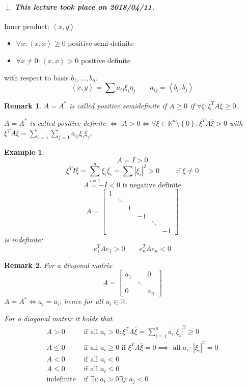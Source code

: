 \documentclass[a4paper]{article}
\numberwithin{lecref}{section}
\newtheorem*{Example}{Example}
\newtheorem*{Remark}{Remark}
\newcommand{\set}[1]{\left\{#1\right\}}
\newcommand{\angel}[1]{\left\langle#1\right\rangle}
\newcommand{\card}[1]{\left|#1\right|}
\newcommand{\dateref}[1]{%
  \begin{mdframed}[backgroundcolor=gray!10,innerbottommargin=0pt,innertopmargin=0pt]
    \paragraph{\textit{$\downarrow$ This lecture took place on #1.}}%
  \end{mdframed}%
}
\begin{document}
\dateref{2018/04/11}

Inner product: $\angel{x,y}$
\begin{itemize}
  \item $\forall x: \angel{x,x} \geq 0$ positive semi-definite
  \item $\forall x \neq 0: \angel{x,x} > 0$ positive definite
\end{itemize}
with respect to basis $b_1, \dots, b_n$.
\[ \angel{x,y} = \sum a_{ij} \xi_i \overline{\eta_j} \qquad a_{ij} = \angel{b_i, b_j} \]

\begin{Remark}
  $A = A^*$ is called \emph{positive semidefinite} if $A \geq 0$ if $\forall \xi: \xi^T A \overline{\xi} \geq 0$.

  $A = A^*$ is called \emph{positive definite} $\iff$ $A > 0 \iff \forall \xi \in \mathbb K^n\setminus \set{0}: \xi^T A \overline{\xi} > 0$
  with $\xi^T A \overline{\xi} = \sum_{i=1} \sum_{j=1} a_{ij} \xi_i \overline{\xi_j}$.
\end{Remark}

\begin{Example}
  \[ A = I > 0 \]
  \[ \xi^T I \overline{\xi} = \sum_{i=1}^n \xi_i \overline{\xi_i} = \sum \card{\xi_i}^2 > 0 \qquad \text{ if } \xi \neq 0 \]
  \[ A = -I < 0 \text{ is negative definite} \]
  \[
    A = \begin{bmatrix}
      1 &        &   &    &        & \\
        & \ddots &   &    &        & \\
        &        & 1 &    &        & \\
        &        &   & -1 &        & \\
        &        &   &    & \ddots & \\
        &        &   &    &        & -1
    \end{bmatrix}
  \]
  is indefinite:
  \[ e_1^T A e_1 > 0 \qquad e_n^T A e_n < 0 \]
\end{Example}

\begin{Remark}
  For a diagonal matrix
  \[ A = \begin{bmatrix} a_1 &  & 0 \\ & \ddots & \\ 0 &  & a_n \end{bmatrix} \]
  $A = A^* \iff a_i = \overline{a}_i$, hence for all $a_i \in \mathbb R$.

  For a diagonal matrix it holds that
  \begin{align*}
    A > 0 & \text{ if all } a_i > 0: \xi^T A \overline{\xi} = \sum_{i=1}^n a_i \card{\xi_i}^2 \geq 0 \\
    A \leq 0 & \text{ if all } a_i \geq 0 \text{ if } \xi^T A \overline{\xi} = 0 \implies \text{ all } a_i \cdot \card{\xi_i}^2 = 0 \\
    A < 0 & \text{ if all } a_i < 0 \\
    A \leq 0 & \text{ if all } a_i \leq 0 \\
    \text{indefinite} & \text{ if } \exists i: a_i > 0 \exists j: a_j < 0
  \end{align*}
\end{Remark}
\end{document}
